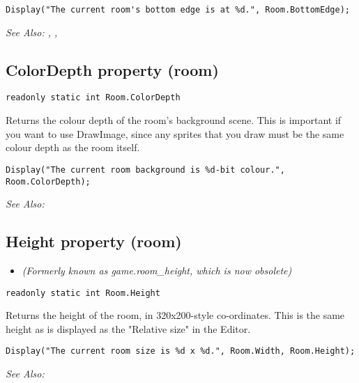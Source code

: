 \begin{verbatim}
Display("The current room's bottom edge is at %d.", Room.BottomEdge);
\end{verbatim}

\it{See Also:} , ,


\subsection{ColorDepth property (room)}\label{Room.ColorDepth}%

\begin{verbatim}
readonly static int Room.ColorDepth
\end{verbatim}
Returns the colour depth of the room's background scene. This is important if
you want to use DrawImage, since any sprites that you draw must be the same
colour depth as the room itself.

\begin{verbatim}
Display("The current room background is %d-bit colour.", Room.ColorDepth);
\end{verbatim}

\it{See Also:} 


\subsection{Height property (room)}\label{Room.Height}%

\begin{itemize}
\item \it{(Formerly known as game.room_height, which is now obsolete)}
\end{itemize}

\begin{verbatim}
readonly static int Room.Height
\end{verbatim}
Returns the height of the room, in 320x200-style co-ordinates. This is
the same height as is displayed as the "Relative size" in the Editor.

\begin{verbatim}
Display("The current room size is %d x %d.", Room.Width, Room.Height);
\end{verbatim}

\it{See Also:} 


